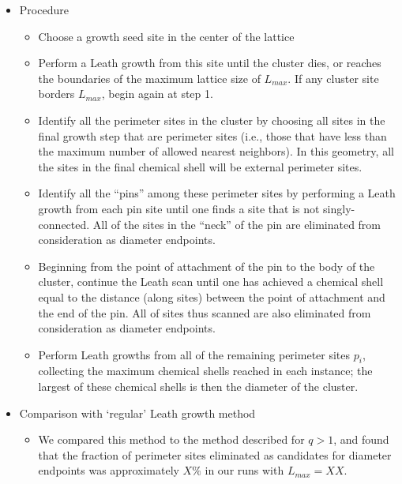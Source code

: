 \documentclass[11pt]{article}
\begin{document}
\begin{itemize}
\item Procedure
\label{sec-5-2-4-6}%
\begin{itemize}

\item Choose a growth seed site in the center of the lattice\\
\label{sec-5-2-4-6-1}%
\item Perform a Leath growth from this site until the cluster dies, or reaches the boundaries of the maximum lattice size of $L_{max}$. If any cluster site borders $L_{max}$, begin again at step 1.\\
\label{sec-5-2-4-6-2}%
\item Identify all the perimeter sites in the cluster by choosing all sites in the final growth step that are perimeter sites (i.e., those that have less than the maximum number of allowed nearest neighbors).  In this geometry, all the sites in the final chemical shell will be external perimeter sites.\\
\label{sec-5-2-4-6-3}%
\item Identify all the ``pins'' among these perimeter sites by performing a Leath growth from each pin site until one finds a site that is not singly-connected.  All of the sites in the ``neck'' of the pin are eliminated from consideration as diameter endpoints.\\
\label{sec-5-2-4-6-4}%
\item Beginning from the point of attachment of the pin to the body of the cluster, continue the Leath scan until one has achieved a chemical shell equal to the distance (along sites) between the point of attachment and the end of the pin.  All of sites thus scanned are also eliminated from consideration as diameter endpoints.\\
\label{sec-5-2-4-6-5}%
\item Perform Leath growths from all of the remaining perimeter sites $p_i$, collecting the maximum chemical shells reached in each instance; the largest of these chemical shells is then the diameter of the cluster.\\
\label{sec-5-2-4-6-6}%
\end{itemize} %

\item Comparison with `regular' Leath growth method
\label{sec-5-2-4-7}%
\begin{itemize}

\item We compared this method to the method described for $q>1$, and found that the fraction of perimeter sites eliminated as candidates for diameter endpoints was approximately $X\%$ in our runs with $L_{max}=XX$.\\
\label{sec-5-2-4-7-1}%
\end{itemize} %


\end{itemize}
\end{document}
